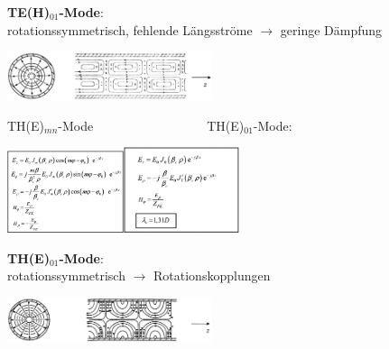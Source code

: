 \documentclass[english]{latex4ei/latex4ei_sheet}
\begin{document}
\begin{sectionbox}
	\textbf{TE(H)$_{01}$-Mode}:\\
	rotationssymmetrisch, fehlende Längsströme $\rightarrow$ geringe Dämpfung
	\begin{center}\includegraphics[width = 6cm]{./img/hl-rund-h01_2.png}\end{center}
	TH(E)$_{mn}$-Mode$\quad\quad\quad\quad\quad\quad\quad\quad\quad$TH(E)$_{01}$-Mode:
	\begin{center}\includegraphics[width = 3.4cm]{./img/hl-rund-emn.png}\includegraphics[width = 3.4cm]{./img/hl-rund-e01.png}\end{center}
	\textbf{TH(E)$_{01}$-Mode}:\\ 
	rotationssymmetrisch $\rightarrow$ Rotationskopplungen
	\begin{center}\includegraphics[width = 6cm]{./img/hl-rund-e01_2.png}\end{center}

\end{sectionbox}
\end{document}
